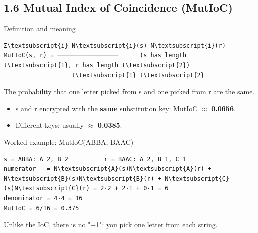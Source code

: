 \documentclass[11pt,a4paper]{article}
\begin{document}
\subsection*{1.6 Mutual Index of Coincidence (MutIoC)}
\begin{concept}{Definition and meaning}
\begin{workbox}
\begin{Verbatim}[commandchars=\\\{\},fontsize=\footnotesize]
               Σ\textsubscript{i} N\textsubscript{i}(s) N\textsubscript{i}(r)
MutIoC(s, r) = ─────────────────      (s has length t\textsubscript{1}, r has length t\textsubscript{2})
                   t\textsubscript{1} t\textsubscript{2}
\end{Verbatim}
\end{workbox}
The probability that one letter picked from s and one picked from r are the same.\par
\begin{itemize}
\item s and r encrypted with the \textbf{same} substitution key: MutIoC \ensuremath{\approx} \textbf{0.0656}.
\item Different keys: usually \ensuremath{\approx} \textbf{0.0385}.
\end{itemize}
\end{concept}
\begin{example}{Worked example: MutIoC(ABBA, BAAC)}
\begin{workbox}
\begin{Verbatim}[commandchars=\\\{\},fontsize=\footnotesize]
s = ABBA: A 2, B 2          r = BAAC: A 2, B 1, C 1
numerator   = N\textsubscript{A}(s)N\textsubscript{A}(r) + N\textsubscript{B}(s)N\textsubscript{B}(r) + N\textsubscript{C}(s)N\textsubscript{C}(r) = 2·2 + 2·1 + 0·1 = 6
denominator = 4·4 = 16
MutIoC = 6/16 = 0.375
\end{Verbatim}
\end{workbox}
Unlike the IoC, there is no "\ensuremath{-}1": you pick one letter from each string.\par
\end{example}
\end{document}

